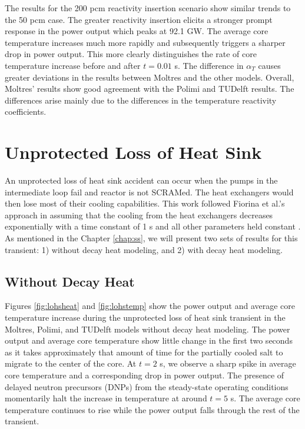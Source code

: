 The results for the 200 pcm reactivity insertion scenario show similar trends
to the 50 pcm case. The greater reactivity insertion elicits a stronger
prompt response in the power output which peaks at 92.1 GW. The average core
temperature increases much more rapidly and subsequently triggers a sharper
drop in power output. This more clearly distinguishes the rate of
core temperature increase before and after $t=0.01$ s. The difference in
$\alpha_T$ causes greater deviations in the results between Moltres and the
other models. Overall,
Moltres' results show good agreement with the Polimi and TUDelft results.
The differences arise mainly due to the differences in the temperature
reactivity coefficients.

\clearpage

\section{Unprotected Loss of Heat Sink}

An unprotected loss of heat sink accident can occur when the pumps in the
intermediate loop fail and reactor is not SCRAMed. The heat exchangers would
then lose most of their
cooling capabilities. This work followed Fiorina et al.'s approach in assuming
that the cooling from the heat exchangers decreases exponentially with a time
constant of 1 s and all other parameters held constant
\cite{fiorina_modelling_2014}. As mentioned in the Chapter \ref{chap:ss}, we
will present two sets of results for this transient: 1) without decay heat
modeling, and 2) with decay heat modeling.

\subsection{Without Decay Heat} \label{sec:wodecayheat}

Figures \ref{fig:lohsheat} and \ref{fig:lohstemp} show the power output and
average core temperature increase during the unprotected loss of heat sink
transient in the Moltres, Polimi, and TUDelft models without decay heat
modeling. The power output and average core temperature show little change in
the first two seconds as it takes approximately that amount of time for the
partially cooled salt to migrate to the center of the core. At $t=2$ s, we
observe a sharp spike in average core temperature and a corresponding drop
in power output. The presence of delayed neutron precursors (DNPs) from the
steady-state operating conditions momentarily halt the increase in temperature
at around $t=5$ s. The average core temperature continues to rise while the
power output falls through the rest of the transient.


